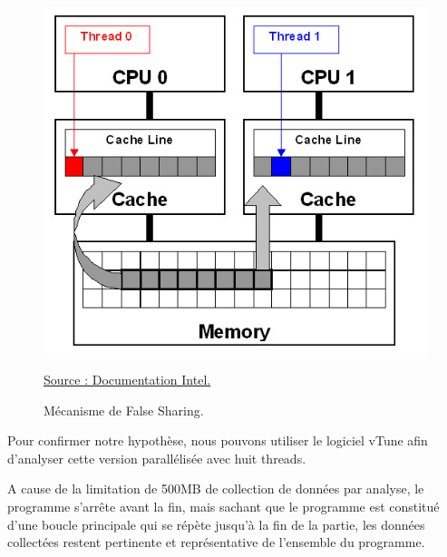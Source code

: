 \documentclass[
 aip,
 jmp,
 amsmath,amssymb,
 reprint
]{revtex4-1}
\begin{document}
\begin{figure}[H]
  \includegraphics[width=\linewidth, keepaspectratio=true]{false_sharing.jpg}
  \centering
  \caption{Mécanisme de False Sharing.\label{Fig:false_sharing}}{\href{https://software.intel.com/en-us/articles/avoiding-and-identifying-false-sharing-among-threads}{Source : Documentation Intel.}}
\end{figure}

Pour confirmer notre hypothèse, nous pouvons utiliser le logiciel vTune afin d'analyser cette version parallélisée avec huit threads.\par
A cause de la limitation de 500MB de collection de données par analyse, le programme s'arrête avant la fin, mais sachant que le programme est constitué d'une boucle principale qui se répète jusqu'à la fin de la partie, les données collectées restent pertinente et représentative de l'ensemble du programme.
\end{document}
